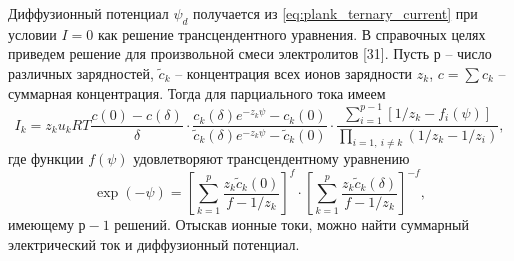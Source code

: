 Диффузионный потенциал \( \psi_d \) получается из
\eqref{eq:plank_ternary_current} при условии \( I = 0 \) как решение
трансцендентного уравнения. В справочных целях приведем решение для произвольной
смеси электролитов [31]. Пусть р -- число различных зарядностей,
\( \tilde{c}_k \) -- концентрация всех ионов зарядности \( z_k \),
\( c = \sum c_k \) -- суммарная концентрация. Тогда для парциального тока имеем
\begin{equation}
    I_k = z_ku_kRT\frac{c(0) - c(\delta)}{\delta}\cdot
    \frac{c_k(\delta)e^{-z_k\psi}-c_k(0)}
        {\tilde{c}_k(\delta)e^{-z_k\psi}-\tilde{c}_k(0)}\cdot
    \frac{\sum_{i=1}^{p-1}[1/z_k - f_i(\psi)]}
        {\prod_{i=1,\ i \neq k}(1/z_k - 1/z_i)},
\end{equation}
где функции \( f(\psi) \) удовлетворяют трансцендентному уравнению
\begin{equation}
    \exp(-\psi) = \left[\sum_{k=1}^p\frac{z_k\tilde{c}_k(0)}{f-1/z_k}\right]^f
    \cdot \left[\sum_{k=1}^p\frac{z_k\tilde{c}_k(\delta)}{f-1/z_k}\right]^{-f},
\end{equation}
имеющему \( р-1 \) решений. Отыскав ионные токи, можно найти суммарный
электрический ток и диффузионный потенциал.

